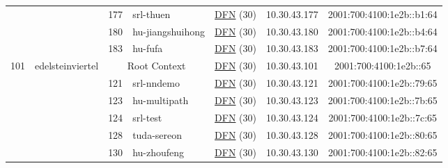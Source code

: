 \begin{small}
\begin{center}
\begin{longtable}{|c|c|c|c|c|c|c|c|}
  &  & \tiny{177} & \multicolumn{1}{|l|}{\tiny{srl-thuen}} & \multicolumn{2}{|c|}{\tiny{\href{https://www.dfn.de}{DFN} (30)}} & \tiny{10.30.43.177} & \tiny{2001:700:4100:1e2b::b1:64} \\* \cline{3-3}\cline{4-4}\cline{5-5}\cline{6-6}\cline{7-7}\cline{8-8}
  &  & \tiny{180} & \multicolumn{1}{|l|}{\tiny{hu-jiangshuihong}} & \multicolumn{2}{|c|}{\tiny{\href{https://www.dfn.de}{DFN} (30)}} & \tiny{10.30.43.180} & \tiny{2001:700:4100:1e2b::b4:64} \\* \cline{3-3}\cline{4-4}\cline{5-5}\cline{6-6}\cline{7-7}\cline{8-8}
  &  & \tiny{183} & \multicolumn{1}{|l|}{\tiny{hu-fufa}} & \multicolumn{2}{|c|}{\tiny{\href{https://www.dfn.de}{DFN} (30)}} & \tiny{10.30.43.183} & \tiny{2001:700:4100:1e2b::b7:64} \\ \hline
 \multirow{20}{*}{\tiny{101}} & \multicolumn{1}{|l|}{\multirow{20}{*}{\tiny{edelsteinviertel}}} & \multicolumn{2}{|c|}{\tiny{Root Context}} & \multicolumn{2}{|c|}{\tiny{\href{https://www.dfn.de}{DFN} (30)}} & \tiny{10.30.43.101} & \tiny{2001:700:4100:1e2b::65} \\* \cline{3-3}\cline{4-4}\cline{5-5}\cline{6-6}\cline{7-7}\cline{8-8}
  &  & \tiny{121} & \multicolumn{1}{|l|}{\tiny{srl-nndemo}} & \multicolumn{2}{|c|}{\tiny{\href{https://www.dfn.de}{DFN} (30)}} & \tiny{10.30.43.121} & \tiny{2001:700:4100:1e2b::79:65} \\* \cline{3-3}\cline{4-4}\cline{5-5}\cline{6-6}\cline{7-7}\cline{8-8}
  &  & \tiny{123} & \multicolumn{1}{|l|}{\tiny{hu-multipath}} & \multicolumn{2}{|c|}{\tiny{\href{https://www.dfn.de}{DFN} (30)}} & \tiny{10.30.43.123} & \tiny{2001:700:4100:1e2b::7b:65} \\* \cline{3-3}\cline{4-4}\cline{5-5}\cline{6-6}\cline{7-7}\cline{8-8}
  &  & \tiny{124} & \multicolumn{1}{|l|}{\tiny{srl-test}} & \multicolumn{2}{|c|}{\tiny{\href{https://www.dfn.de}{DFN} (30)}} & \tiny{10.30.43.124} & \tiny{2001:700:4100:1e2b::7c:65} \\* \cline{3-3}\cline{4-4}\cline{5-5}\cline{6-6}\cline{7-7}\cline{8-8}
  &  & \tiny{128} & \multicolumn{1}{|l|}{\tiny{tuda-sereon}} & \multicolumn{2}{|c|}{\tiny{\href{https://www.dfn.de}{DFN} (30)}} & \tiny{10.30.43.128} & \tiny{2001:700:4100:1e2b::80:65} \\* \cline{3-3}\cline{4-4}\cline{5-5}\cline{6-6}\cline{7-7}\cline{8-8}
  &  & \tiny{130} & \multicolumn{1}{|l|}{\tiny{hu-zhoufeng}} & \multicolumn{2}{|c|}{\tiny{\href{https://www.dfn.de}{DFN} (30)}} & \tiny{10.30.43.130} & \tiny{2001:700:4100:1e2b::82:65} \\* \cline{3-3}\cline{4-4}\cline{5-5}\cline{6-6}\cline{7-7}\cline{8-8}

\end{longtable}
\end{center}
\end{small}

